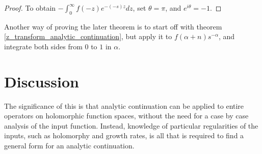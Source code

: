\documentclass{article}
\begin{document}
\begin{proof}
		To obtain $ -\int_{0}^{\infty} f(-z) e^{-(-s)z} dz$, set $\theta = \pi$, and $e^{i \theta} = -1$. 
		
	\end{proof}

	Another way of proving the later theorem is to start off with theorem \ref{z_transform_analytic_continuation}, but apply it to $f(\alpha + n) s^{-\alpha}$, and integrate both sides from $0$ to $1$ in $\alpha$. 

	
	
	\section{ Discussion }
	
	The significance of this is that analytic continuation can be applied to entire operators on holomorphic function spaces, without the need for a case by case analysis of the input function. Instead, knowledge of particular regularities of the inputs, such as holomorphy and growth rates, is all that is required to find a general form for an analytic continuation. 
	
	
	
	
	
\end{document}
